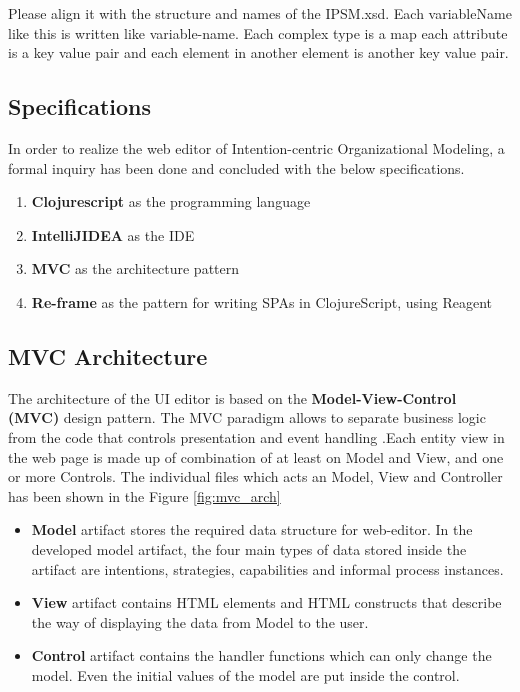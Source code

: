 Please align it with the structure and names of the IPSM.xsd. Each variableName like this is written like variable-name. Each complex type is a map each attribute is a key value pair and each element in another element is another key value pair.


\subsection{Specifications}
\label{subsec:specifications}
In order to realize the web editor of Intention-centric Organizational Modeling, a formal inquiry has been done and concluded with the below specifications.

\begin{enumerate}   
	\item \textbf{Clojurescript} as the programming language
	\item \textbf{IntelliJIDEA} as the IDE
	\item \textbf{MVC} as the architecture pattern
	\item \textbf{Re-frame} as the pattern for writing SPAs in ClojureScript, using Reagent	
\end{enumerate}

\subsection{MVC Architecture}
\label{subsec:mvcarch}
 The architecture of the UI editor is based on the \textbf{Model-View-Control (MVC)} design pattern. The MVC paradigm allows to separate business logic from the code that controls presentation and event handling \cite{Oracle2016}.Each entity view in the web page is made up of combination of at least on Model and View, and one or more Controls. The individual files which acts an Model, View and Controller has been shown in the Figure \ref{fig:mvc_arch}

\begin{itemize}
	\item \textbf{Model} artifact stores the required data structure for web-editor. In the developed model artifact, the four main types of data stored inside the artifact are intentions, strategies, capabilities and informal process instances. 
	\item \textbf{View} artifact contains HTML elements and HTML constructs that describe the way of displaying the data from Model to the user.
	\item \textbf{Control} artifact contains the handler functions which can only change the model. Even the initial values of the model are put inside the control. 
\end{itemize}


